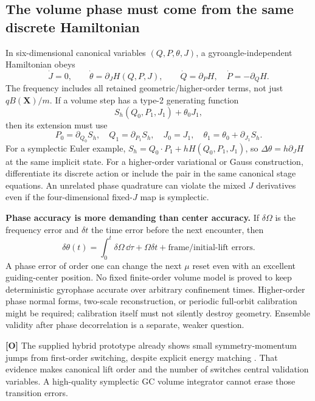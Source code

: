 \documentclass[10pt,a4paper]{article}
\newcommand{\X}{\mathbf X}\newcommand{\n}{\mathbf n}
\newcommand{\obs}{\textbf{[O]}}
\begin{document}
\subsection{The volume phase must come from the same discrete Hamiltonian}
In six-dimensional canonical variables $(Q,P,\theta,J)$, a gyroangle-independent Hamiltonian obeys
\begin{equation}
 \dot J=0,\qquad\dot\theta=\partial_J H(Q,P,J),\qquad
 \dot Q=\partial_P H,\quad\dot P=-\partial_Q H.
\end{equation}
The frequency includes all retained geometric/higher-order terms, not just $qB(\X)/m$. If a volume step has a type-2 generating function
\begin{equation}\label{eq:generating}
 S_h(Q_0,P_1,J_1)+\theta_0J_1,
\end{equation}
then its extension must use
\begin{equation}
 P_0=\partial_{Q_0}S_h,\quad Q_1=\partial_{P_1}S_h,
 \quad J_0=J_1,\quad\theta_1=\theta_0+\partial_{J_1}S_h.
\end{equation}
For a symplectic Euler example, $S_h=Q_0\cdot P_1+hH(Q_0,P_1,J_1)$, so $\Delta\theta=h\partial_JH$ at the same implicit state. For a higher-order variational or Gauss construction, differentiate its discrete action or include the pair in the same canonical stage equations. An unrelated phase quadrature can violate the mixed $J$ derivatives even if the four-dimensional fixed-$J$ map is symplectic.

\textbf{Phase accuracy is more demanding than center accuracy.} If $\delta\Omega$ is the frequency error and $\delta t$ the time error before the next encounter, then
\begin{equation}\label{eq:phaseerror}
 \delta\theta(t)=\int_0^t\delta\Omega\,\dd\tau+\Omega\delta t
                  +\text{frame/initial-lift errors}.
\end{equation}
A phase error of order one can change the next $\mu$ reset even with an excellent guiding-center position. No fixed finite-order volume model is proved to keep deterministic gyrophase accurate over arbitrary confinement times. Higher-order phase normal forms, two-scale reconstruction, or periodic full-orbit calibration might be required; calibration itself must not silently destroy geometry. Ensemble validity after phase decorrelation is a separate, weaker question.

\obs{} The supplied hybrid prototype already shows small symmetry-momentum jumps from first-order switching, despite explicit energy matching \cite{sheetreadme}. That evidence makes canonical lift order and the number of switches central validation variables. A high-quality symplectic GC volume integrator cannot erase those transition errors.
\end{document}
